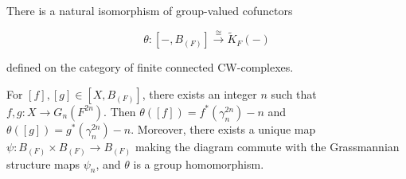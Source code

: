 There is a natural isomorphism of group-valued cofunctors

$$\theta: [-, B_{(F)}] \xrightarrow{\cong} \tilde{K}_F(-)$$

defined on the category of finite connected CW-complexes.

For $[f], [g] \in [X, B_{(F)}]$, there exists an integer $n$ such that $f, g: X \rightarrow G_n(F^{2n})$. Then $\theta([f]) = f^*(\gamma_n^{2n}) - n$ and $\theta([g]) = g^*(\gamma_n^{2n}) - n$. Moreover, there exists a unique map $\psi: B_{(F)} \times B_{(F)} \rightarrow B_{(F)}$ making the diagram commute with the Grassmannian structure maps $\psi_n$, and $\theta$ is a group homomorphism.
